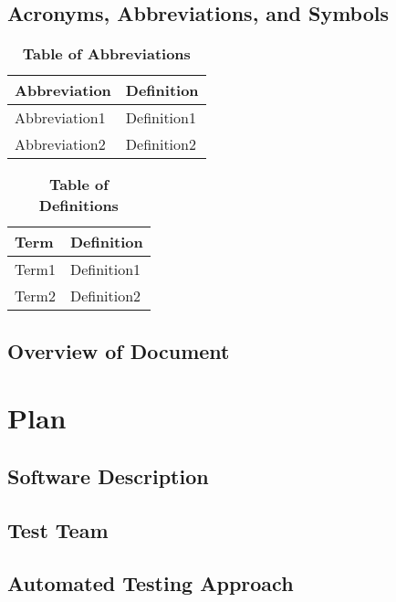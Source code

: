 \documentclass[12pt, titlepage]{article}
\begin{document}
\subsection{Acronyms, Abbreviations, and Symbols}
	
\begin{table}[hbp]
    \caption{\textbf{Table of Abbreviations}}
    \label{Table}
    \begin{tabularx}{\textwidth}{p{3cm}X}
        \toprule
        \textbf{Abbreviation} & \textbf{Definition} \\
        \midrule
        Abbreviation1 & Definition1\\
        Abbreviation2 & Definition2\\
        \bottomrule
    \end{tabularx}
\end{table}

\begin{table}[!htbp]
    \caption{\textbf{Table of Definitions}}
    \label{Table}
    \begin{tabularx}{\textwidth}{p{3cm}X}
        \toprule
        \textbf{Term} & \textbf{Definition}\\
        \midrule
        Term1 & Definition1\\
        Term2 & Definition2\\
        \bottomrule
    \end{tabularx}
\end{table}	

\subsection{Overview of Document}


\section{Plan}
	
\subsection{Software Description}


\subsection{Test Team}


\subsection{Automated Testing Approach}
\end{document}

